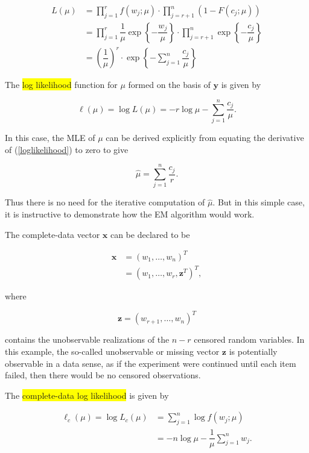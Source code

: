 \documentclass[11pt, a4paper]{article}
\begin{document}
\begin{align}
L(\mu)
&=
\prod \limits_{j = 1}^{r} f(w_j; \mu) \cdot \prod \limits_{j = r+1}^{n} \left( 1 - F(c_j; \mu) \right) \nonumber \\[0.5em]
&=
\prod \limits_{j = 1}^{r} \dfrac{1}{\mu} \exp\!\left\{-\dfrac{w_j}{\mu}\right\} \cdot \prod \limits_{j = r+1}^{n} \exp\!\left\{-\dfrac{c_j}{\mu}\right\} \nonumber \\[0.5em]
&=
\left( \dfrac{1}{\mu} \right)^r \cdot \exp\!\left\{- \sum \limits_{j = 1}^{n} \dfrac{c_j}{\mu} \right\}
\end{align}

\newpage

The \colorbox{yellow}{log likelihood} function for $\mu$ formed on the basis of
$\boldsymbol{y}$ is given by

\begin{equation} \label{loglikelihood}
\ell(\mu)
=
\log L(\mu)
=
-r \log \mu
-
\sum \limits_{j=1}^{n} \dfrac{c_j}{\mu}.
\end{equation}

In this case, the MLE of $\mu$ can be derived explicitly from
equating the derivative of (\ref{loglikelihood}) to zero to give

\[
\hat{\mu}
=
\sum \limits_{j=1}^{n} \dfrac{c_j}{r}.
\]

Thus there is no need for the iterative computation of $\hat{\mu}$.
But in this simple case, it is instructive to demonstrate how the
EM algorithm would work.

The complete-data vector $\boldsymbol{x}$ can be declared to be

\begin{align*}
\boldsymbol{x}
&=
(w_1,\ldots,w_n)^T \\[0.5em]
&=
(w_1,\ldots,w_r,\boldsymbol{z}^T)^T,
\end{align*}

where

\[
\boldsymbol{z}
=
(w_{r+1},\ldots,w_n)^T
\]

contains the unobservable realizations of the $n-r$ censored random
variables. In this example, the so-called unobservable or missing
vector $\boldsymbol{z}$ is potentially observable in a data sense,
as if the experiment were continued until each item failed, then there
would be no censored observations.

The \colorbox{yellow}{complete-data log likelihood} is given by

\begin{align*}
\ell_c(\mu)
=
\log L_c(\mu)
&=
\sum \limits_{j=1}^{n}
\log f(w_j;\mu) \\[0.5em]
&=
-n \log \mu
-
\dfrac{1}{\mu}
\sum \limits_{j=1}^{n} w_j .
\end{align*}
\end{document}
